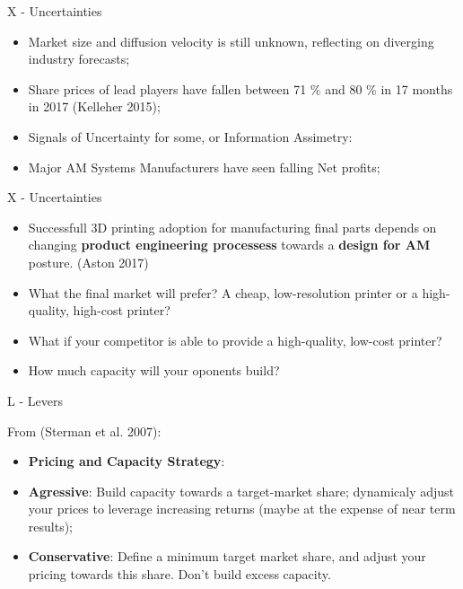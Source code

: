 \documentclass[12pt,ignorenonframetext,]{beamer}
\providecommand{\tightlist}{%
  \setlength{\itemsep}{0pt}\setlength{\parskip}{0pt}}
\begin{document}
\begin{frame}{X - Uncertainties}
\protect\hypertarget{x---uncertainties}{}

\begin{itemize}
\item
  Market size and diffusion velocity is still unknown, reflecting on
  diverging industry forecasts;
\item
  Share prices of lead players have fallen between 71 \% and 80 \% in 17
  months in 2017 (Kelleher 2015);
\item
  Signals of Uncertainty for some, or Information Assimetry:
\item
  Major AM Systems Manufacturers have seen falling Net profits;
\end{itemize}

\end{frame}

\begin{frame}{X - Uncertainties}
\protect\hypertarget{x---uncertainties-1}{}

\begin{itemize}
\item
  Successfull 3D printing adoption for manufacturing final parts depends
  on changing \textbf{product engineering processess} towards a
  \textbf{design for AM} posture. (Aston 2017)
\item
  What the final market will prefer? A cheap, low-resolution printer or
  a high-quality, high-cost printer?
\item
  What if your competitor is able to provide a high-quality, low-cost
  printer?
\item
  How much capacity will your oponents build?
\end{itemize}

\end{frame}

\begin{frame}{L - Levers}
\protect\hypertarget{l---levers}{}

From (Sterman et al. 2007):

\begin{itemize}
\tightlist
\item
  \textbf{Pricing and Capacity Strategy}:
\item
  \textbf{Agressive}: Build capacity towards a target-market share;
  dynamicaly adjust your prices to leverage increasing returns (maybe at
  the expense of near term results);
\item
  \textbf{Conservative}: Define a minimum target market share, and
  adjust your pricing towards this share. Don't build excess capacity.
\end{itemize}

\end{frame}
\end{document}
